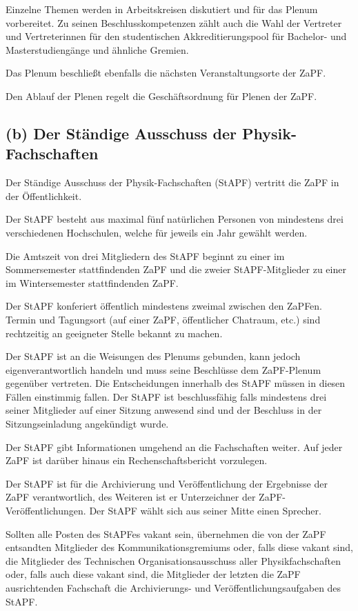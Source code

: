 \documentclass[12pt,oneside]{scrartcl}
\begin{document}
Einzelne Themen werden in Arbeitskreisen diskutiert und für das Plenum vorbereitet.
Zu seinen Beschlusskompetenzen zählt auch die Wahl der Vertreter und Vertreterinnen
für den studentischen Akkreditierungspool für Bachelor- und Masterstudiengänge und
ähnliche Gremien.

Das Plenum beschließt ebenfalls die nächsten Veranstaltungsorte der ZaPF.

Den Ablauf der Plenen regelt die Geschäftsordnung für Plenen der ZaPF.


\subsection{(b) Der Ständige Ausschuss der Physik-Fachschaften%
  \label{b-der-standige-ausschuss-der-physik-fachschaften}%
}

Der Ständige Ausschuss der Physik-Fachschaften (StAPF) vertritt die ZaPF in der
Öffentlichkeit.

Der StAPF besteht aus maximal fünf natürlichen Personen von mindestens drei
verschiedenen Hochschulen, welche für jeweils ein Jahr gewählt werden.

Die Amtszeit von drei Mitgliedern des StAPF beginnt zu einer im Sommersemester
stattfindenden ZaPF und die zweier StAPF-Mitglieder zu einer im Wintersemester
stattfindenden ZaPF.

Der StAPF konferiert öffentlich mindestens zweimal zwischen den ZaPFen.
Termin und Tagungsort (auf einer ZaPF, öffentlicher Chatraum, etc.) sind
rechtzeitig an geeigneter Stelle bekannt zu machen.

Der StAPF ist an die Weisungen des Plenums gebunden, kann jedoch
eigenverantwortlich handeln und muss seine Beschlüsse dem ZaPF-Plenum gegenüber
vertreten.
Die Entscheidungen innerhalb des StAPF müssen in diesen Fällen einstimmig fallen.
Der StAPF ist beschlussfähig falls mindestens drei seiner Mitglieder auf einer
Sitzung anwesend sind und der Beschluss in der Sitzungseinladung angekündigt
wurde.

Der StAPF gibt Informationen umgehend an die Fachschaften weiter.
Auf jeder ZaPF ist darüber hinaus ein Rechenschaftsbericht vorzulegen.

Der StAPF ist für die Archivierung und Veröffentlichung der Ergebnisse der ZaPF
verantwortlich, des Weiteren ist er Unterzeichner der ZaPF-Veröffentlichungen.
Der StAPF wählt sich aus seiner Mitte einen Sprecher.

Sollten alle Posten des StAPFes vakant sein, übernehmen die von der ZaPF
entsandten Mitglieder des Kommunikationsgremiums oder, falls diese vakant sind,
die Mitglieder des Technischen Organisationsausschuss aller Physikfachschaften
oder, falls auch diese vakant sind, die Mitglieder der letzten die ZaPF
ausrichtenden Fachschaft die Archivierungs- und Veröffentlichungsaufgaben des
StAPF.
\end{document}
